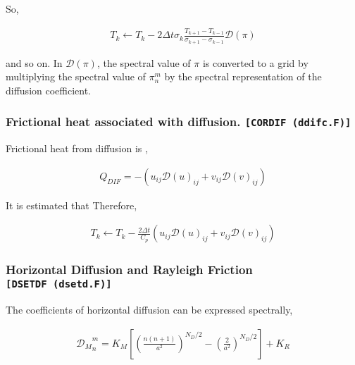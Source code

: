 So,

\begin{eqnarray}
  T_k \leftarrow  T_k 
       -  2 \Delta t
        \sigma_{k} \frac{T_{k+1}-T_{k-1}}{\sigma_{k+1} - \sigma_{k-1}}
        {\mathcal D}(\pi)
\end{eqnarray}

and so on. In \({\mathcal D}(\pi)\), the spectral value of \(\pi\) is
converted to a grid by multiplying the spectral value of \(\pi_n^m\) by
the spectral representation of the diffusion coefficient.

\hypertarget{frictional-heat-associated-with-diffusion.-cordif-ddifc.f}{%
\subsubsection{\texorpdfstring{Frictional heat associated with
diffusion.
\texttt{{[}CORDIF\ (ddifc.F){]}}}{Frictional heat associated with diffusion. {[}CORDIF (ddifc.F){]}}}\label{frictional-heat-associated-with-diffusion.-cordif-ddifc.f}}

Frictional heat from diffusion is ,

\begin{eqnarray}
  Q_{DIF} = - \left( u_{ij} {\mathcal D}(u)_{ij}
                   + v_{ij} {\mathcal D}(v)_{ij} \right)
\end{eqnarray}

It is estimated that Therefore,

\begin{eqnarray}
  T_k \leftarrow  T_k
       -  \frac{2 \Delta t}{C_p}
           \left( u_{ij} {\mathcal D}(u)_{ij}
                 + v_{ij} {\mathcal D}(v)_{ij} \right)
\end{eqnarray}

\hypertarget{horizontal-diffusion-and-rayleigh-friction-dsetdf-dsetd.f}{%
\subsubsection{\texorpdfstring{Horizontal Diffusion and Rayleigh
Friction
\texttt{{[}DSETDF\ (dsetd.F){]}}}{Horizontal Diffusion and Rayleigh Friction {[}DSETDF (dsetd.F){]}}}\label{horizontal-diffusion-and-rayleigh-friction-dsetdf-dsetd.f}}

The coefficients of horizontal diffusion can be expressed spectrally,

\begin{eqnarray}
 {{\mathcal D}_M}_n^m = K_M
                      \left[ \left( \frac{n(n+1)}{a^2} \right)^{N_D/2}
                                - \left( \frac{2}{a^2} \right)^{N_D/2}
                      \right]
                  + K_R
\end{eqnarray}

